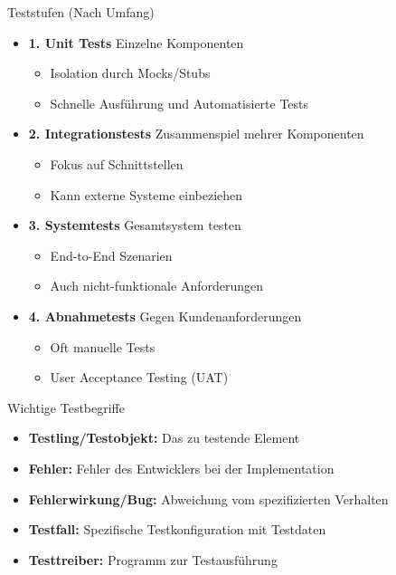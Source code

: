 \begin{concept}{Teststufen} (Nach Umfang)
\begin{itemize}
\item \textbf{1. Unit Tests} Einzelne Komponenten
\begin{itemize}
    \item Isolation durch Mocks/Stubs
    \item Schnelle Ausführung und Automatisierte Tests
\end{itemize}

\item \textbf{2. Integrationstests} Zusammenspiel mehrer Komponenten
\begin{itemize} 
    \item Fokus auf Schnittstellen
    \item Kann externe Systeme einbeziehen
\end{itemize}

\item \textbf{3. Systemtests} Gesamtsystem testen
\begin{itemize}
    \item End-to-End Szenarien
    \item Auch nicht-funktionale Anforderungen
\end{itemize}

\item \textbf{4. Abnahmetests} Gegen Kundenanforderungen
\begin{itemize}
    \item Oft manuelle Tests
    \item User Acceptance Testing (UAT)
\end{itemize}
\end{itemize}
\end{concept}

\begin{theorem}{Wichtige Testbegriffe}
\begin{itemize}
    \item \textbf{Testling/Testobjekt:} Das zu testende Element
    \item \textbf{Fehler:} Fehler des Entwicklers bei der Implementation
    \item \textbf{Fehlerwirkung/Bug:} Abweichung vom spezifizierten Verhalten
    \item \textbf{Testfall:} Spezifische Testkonfiguration mit Testdaten
    \item \textbf{Testtreiber:} Programm zur Testausführung
\end{itemize}
\end{theorem}

